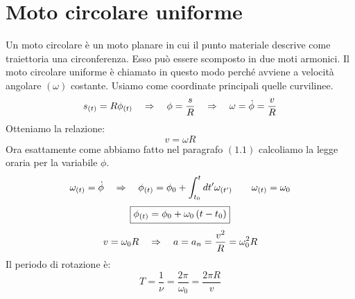 \section{Moto circolare uniforme}
Un moto circolare è un moto planare in cui il punto materiale descrive come
traiettoria una circonferenza. Esso può essere scomposto in due moti armonici. Il moto circolare uniforme è chiamato in questo modo perché avviene a velocità angolare $(\omega)$ costante.
Usiamo come coordinate principali quelle curvilinee.
\begin{equation}
    s_{(t)} = R\phi_{(t)}\quad\Rightarrow\quad \phi = \frac sR\quad\Rightarrow\quad \omega = \dot \phi = \frac vR
\end{equation}
Otteniamo la relazione:
\begin{equation}
    \boxed{v = \omega R}
\label{eq:v=wr}
\end{equation}
Ora esattamente come abbiamo fatto nel paragrafo $(1.1)$ calcoliamo la 
legge oraria per la variabile $\phi$. 
\begin{equation}
    \omega_{(t)} = \dot\phi \quad\Rightarrow\quad \phi_{(t)} = \phi_0 + \int_{t_0}^{t}dt'
    \omega_{(t')}\quad\quad \omega_{(t)} = \omega_0
\end{equation}
\begin{equation}
    \boxed{\phi_{(t)} = \phi_0 +\omega_0\left( t - t_0\right)}
\label{eq:MCU}
\end{equation} 
\begin{equation}
    v = \omega_0R\quad\Rightarrow\quad a = a_n = \frac{v^2}R = \omega_0^2R
\label{eq:an}
\end{equation}
Il periodo di rotazione è:
\begin{equation}
    T = \frac1\nu = \frac{2\pi}{\omega_0} = \frac{2\pi R}v
\label{eq:period}
\end{equation}